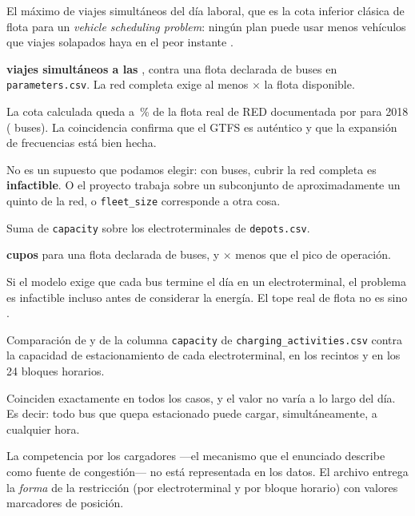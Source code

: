 \documentclass[11pt,a4paper,parskip=half]{scrartcl}
\begin{document}
\begin{campos}
\item[Qué se midió] El máximo de viajes simultáneos del día laboral, que es la cota inferior clásica de flota para un \textit{vehicle scheduling problem}: ningún plan puede usar menos vehículos que viajes solapados haya en el peor instante \citep{bunte_vspoverview_2009}.
\item[Resultado] \textbf{\picoSimultaneo{} viajes simultáneos a las \horaPico}, contra una flota declarada de \flotaDeclarada{} buses en \texttt{parameters.csv}. La red completa exige al menos \ratioFlota$\times$ la flota disponible.
\item[Validación] La cota calculada queda a \desvioValidacion\,\% de la flota real de RED documentada por \citet{galarza_pilotstoscale_2020} para 2018 (\flotaRealRED{} buses). La coincidencia confirma que el GTFS es auténtico y que la expansión de frecuencias está bien hecha.
\item[Implicancia] No es un supuesto que podamos elegir: con \flotaDeclarada{} buses, cubrir la red completa es \textbf{infactible}. O el proyecto trabaja sobre un subconjunto de aproximadamente un quinto de la red, o \texttt{fleet\_size} corresponde a otra cosa.
\end{campos}

\begin{campos}
\item[Qué se midió] Suma de \texttt{capacity} sobre los \numElectroterminales{} electroterminales de \texttt{depots.csv}.
\item[Resultado] \textbf{\cuposTotales{} cupos} para una flota declarada de \flotaDeclarada{} buses, y \ratioCupos$\times$ menos que el pico de operación.
\item[Implicancia] Si el modelo exige que cada bus termine el día en un electroterminal, el problema es infactible incluso antes de considerar la energía. El tope real de flota no es \flotaDeclarada{} sino \cuposTotales.
\end{campos}

\begin{campos}
\item[Qué se midió] Comparación de  y de la columna \texttt{capacity} de \texttt{charging\_activities.csv} contra la capacidad de estacionamiento de cada electroterminal, en los \numElectroterminales{} recintos y en los 24 bloques horarios.
\item[Resultado] Coinciden exactamente en todos los casos, y el valor no varía a lo largo del día. Es decir: todo bus que quepa estacionado puede cargar, simultáneamente, a cualquier hora.
\item[Implicancia] La competencia por los cargadores —el mecanismo que el enunciado describe como fuente de congestión— no está representada en los datos. El archivo entrega la \emph{forma} de la restricción (por electroterminal y por bloque horario) con valores marcadores de posición.
\end{campos}
\end{document}
